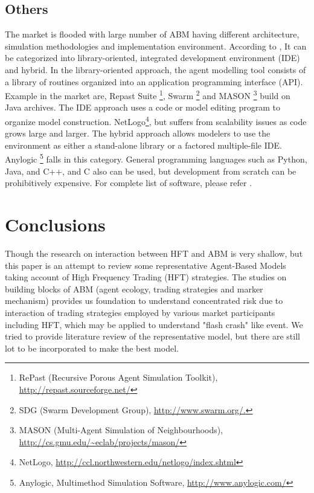 \documentclass[12pt,a4paper]{article}
\numberwithin{equation}{section}
\numberwithin{figure}{section}
\numberwithin{table}{section}
\begin{document}
\subsection{Others}
The market is flooded with large number of ABM having different architecture, simulation methodologies and implementation environment. According to \cite{macal2010}, It can be categorized into library-oriented, integrated development environment (IDE) and hybrid. In the library-oriented approach, the agent modelling tool consists of a library of routines organized into an application programming interface (API). Example in the market are, Repast Suite \footnote{RePast (Recursive Porous Agent Simulation Toolkit), \url{http://repast.sourceforge.net/}}, Swarm \footnote{SDG (Swarm Development Group), \url{http://www.swarm.org/.}} and MASON \footnote{MASON (Multi-Agent Simulation of Neighbourhoods), \url{http://cs.gmu.edu/~eclab/projects/mason/}} build on Java archives. The IDE approach uses a code or model editing program to organize model construction. NetLogo\footnote{NetLogo, \url{http://ccl.northwestern.edu/netlogo/index.shtml}}, but suffers from scalability issues as code grows large and larger. The hybrid approach allows modelers to use the environment as either a stand-alone library or a factored multiple-ﬁle IDE. Anylogic \footnote{Anylogic, Multimethod Simulation Software, \url{http://www.anylogic.com/}} falls in this category. General programming languages such as Python, Java, and C++, and C also can be used, but development from scratch can be prohibitively expensive. For complete list of software, please refer \citet{Allan2009}. 

\section{Conclusions}\label{sec:con}
Though the research on interaction between HFT and ABM is very shallow, but this paper is an attempt to review some representative Agent-Based Models taking account of High Frequency Trading (HFT) strategies. The studies on building blocks of ABM (agent ecology, trading strategies and marker mechanism) provides us foundation to understand concentrated risk due to interaction of trading strategies employed by various market participants including HFT, which may be applied to understand "flash crash" like event. We tried to provide literature review of the representative model, but there are still lot to be incorporated to make the best model.


\newpage
 

\end{document}
